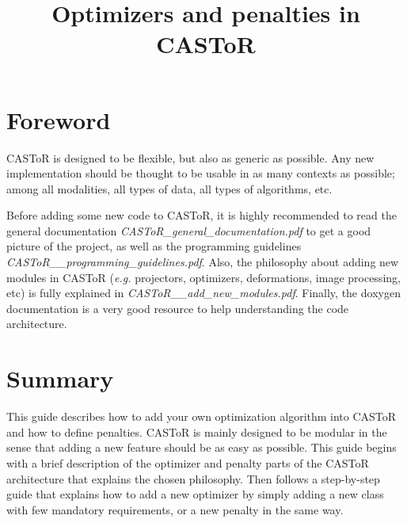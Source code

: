 \documentclass[a4paper, 11pt]{article}
\begin{document}
\title{Optimizers and penalties in CASToR}
\maketitle

\section*{Foreword}

CASToR is designed to be flexible, but also as generic as possible.
Any new implementation should be thought to be usable in as many contexts as possible; among all modalities, all types of data, all types of algorithms, etc.

Before adding some new code to CASToR, it is highly recommended to read the general documentation \textit{CASToR\_general\_documentation.pdf} to get a good picture of the project, as well as the programming guidelines \textit{CASToR\_\_programming\_guidelines.pdf}.
Also, the philosophy about adding new modules in CASToR (\textit{e.g.} projectors, optimizers, deformations, image processing, etc) is fully explained in \textit{CASToR\_\_add\_new\_modules.pdf}.
Finally, the doxygen documentation is a very good resource to help understanding the code architecture.

\section{Summary}

This guide describes how to add your own optimization algorithm into CASToR and how to define penalties.
CASToR is mainly designed to be modular in the sense that adding a new feature should be as easy as possible.
This guide begins with a brief description of the optimizer and penalty parts of the CASToR architecture that explains the chosen philosophy.
Then follows a step-by-step guide that explains how to add a new optimizer by simply adding a new class with few mandatory requirements, or a new penalty in the same way.

\end{document}
